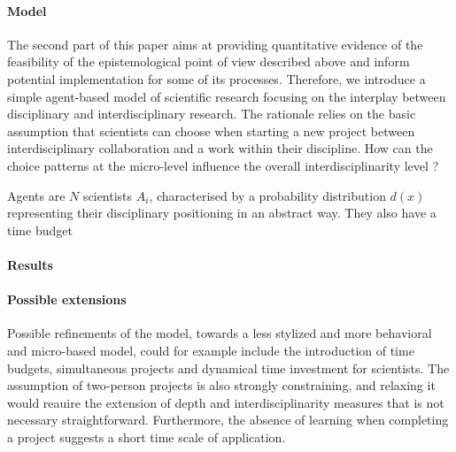 \paragraph{Model}

The second part of this paper aims at providing quantitative evidence of the feasibility of the epistemological point of view described above and inform potential implementation for some of its processes. Therefore, we introduce a simple agent-based model of scientific research focusing on the interplay between disciplinary and interdisciplinary research. The rationale relies on the basic assumption that scientists can choose when starting a new project between interdisciplinary collaboration and a work within their discipline. How can the choice patterns at the micro-level influence the overall interdisciplinarity level ?

Agents are $N$ scientists $A_i$, characterised by a probability distribution $d(x)$ representing their disciplinary positioning in an abstract way. They also have a time budget 


\paragraph{Results}




\paragraph{Possible extensions}

Possible refinements of the model, towards a less stylized and more behavioral and micro-based model, could for example include the introduction of time budgets, simultaneous projects and dynamical time investment for scientists. The assumption of two-person projects is also strongly constraining, and relaxing it would reauire the extension of depth and interdisciplinarity measures that is not necessary straightforward. Furthermore, the absence of learning when completing a project suggests a short time scale of application.





\footnotesize






